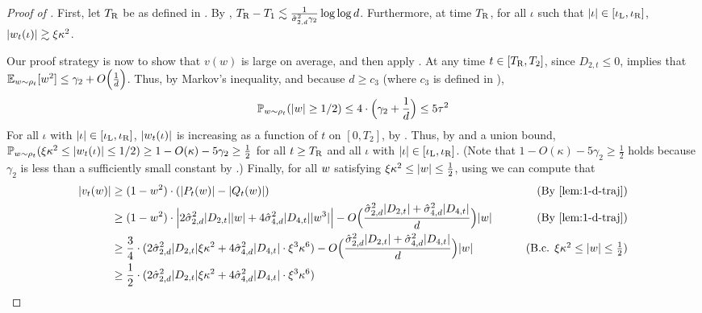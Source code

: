 \begin{proof}[Proof of ]
First, let ${T_{\textup{R}}}$ be as defined in . By , ${T_{\textup{R}}} - T_1 \lesssim \frac{1}{\hat{\sigma}_{2, d}^2 \gamma_2} \log \log d$. Furthermore, at time ${T_{\textup{R}}}$, for all $\iota$ such that $|\iota| \in [\iota_{\textup{L}}, \iota_{\textup{R}}]$, $|w_t(\iota)| \gtrsim \xi \kappa^2$.

Our proof strategy is now to show that $v(w)$ is large on average, and then apply . At any time $t \in [{T_{\textup{R}}}, T_2]$, since $D_{2, t} \leq 0$,  implies that $\operatorname*{\mathbb{E}}_{w \sim \rho_t}[w^2] \leq \gamma_2 + O\Big(\frac{1}{d}\Big)$. Thus, by Markov's inequality, and because $d \geq c_3$ (where $c_3$ is defined in ),
\begin{align}
\mathbb{P}_{w \sim \rho_t} (|w| \geq 1/2) \leq 4 \cdot \Big(\gamma_2 + \frac{1}{d}\Big) \leq 5 \tau^2
\end{align}
For all $\iota$ with $|\iota| \in [\iota_{\textup{L}}, \iota_{\textup{R}}]$, $|w_t(\iota)|$ is increasing as a function of $t$ on $[0, T_2]$, by . Thus, by  and a union bound, $\mathbb{P}_{w \sim \rho_t} (\xi \kappa^2 \leq |w_t(\iota)| \leq 1/2) \geq 1 - O(\kappa) - 5 \gamma_2 \geq \frac{1}{2}$ for all $t \geq {T_{\textup{R}}}$ and all $\iota$ with $|\iota| \in [\iota_{\textup{L}}, \iota_{\textup{R}}]$. (Note that $1 - O(\kappa) - 5 \gamma_2 \geq \frac{1}{2}$ holds because $\gamma_2$ is less than a sufficiently small constant by .) Finally, for all $w$ satisfying $\xi \kappa^2 \leq |w| \leq \frac{1}{2}$, using  we can compute that
\begin{align}
|\vel_t(\w)|
& \geq (1 - \w^2) \cdot (|P_t(\w)| - |Q_t(\w)|)
& \tag{By \Cref{lem:1-d-traj}} \\
& \geq (1 - \w^2) \cdot \Big|2 \sigmaCoeffTwo^2 |D_{2, t}| |\w| + 4 \sigmaCoeffFour^2 |D_{4, t}| |\w^3| \Big| - O\Big(\frac{\sigmaCoeffTwo^2 |D_{2, t}| + \sigmaCoeffFour^2 |D_{4, t}|}{d}\Big) |\w|
& \tag{By \Cref{lem:1-d-traj}} \\
& \geq \frac{3}{4} \cdot (2 \sigmaCoeffTwo^2 |D_{2, t}| \xi \kappa^2 + 4 \sigmaCoeffFour^2 |D_{4, t}| \cdot \xi^3 \kappa^6) - O\Big(\frac{\sigmaCoeffTwo^2 |D_{2, t}| + \sigmaCoeffFour^2 |D_{4, t}|}{d}\Big) |\w|
& \tag{B.c. $\xi \kappa^2 \leq |\w| \leq \frac{1}{2}$} \\
& \geq \frac{1}{2} \cdot (2 \sigmaCoeffTwo^2 |D_{2, t}| \xi \kappa^2 + 4 \sigmaCoeffFour^2 |D_{4, t}| \cdot \xi^3 \kappa^6)

\end{align}
\end{proof}
